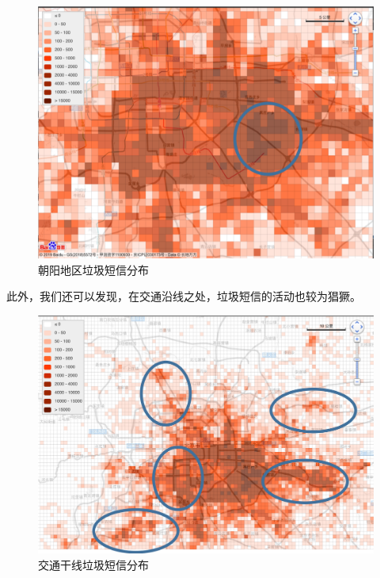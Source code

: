 \documentclass[12pt,a4paper]{article}
\begin{document}
\begin{itemize}
	\begin{flushleft}
		\begin{figure}[H]
			\centering
				\includegraphics[width=\linewidth]{pic5.png}
				\caption{朝阳地区垃圾短信分布}
		\end{figure}
	\end{flushleft}

	此外，我们还可以发现，在交通沿线之处，垃圾短信的活动也较为猖獗。

	\begin{flushleft}
		\begin{figure}[H]
			\centering
				\includegraphics[width=\linewidth]{pic6.png}
				\caption{交通干线垃圾短信分布}
		\end{figure}
	\end{flushleft}


\end{itemize}
\end{document}

